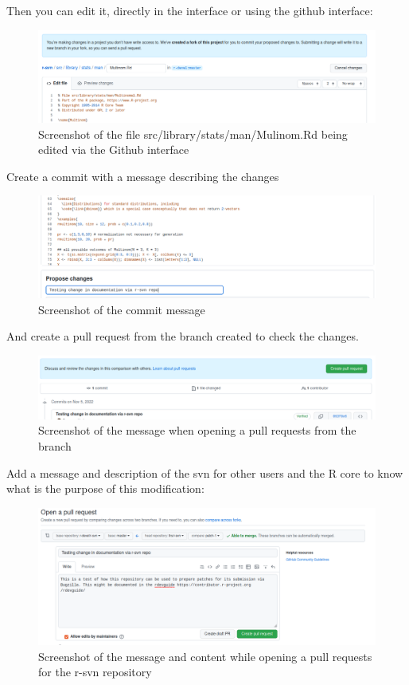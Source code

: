 \documentclass[
]{book}
\begin{document}
Then you can edit it, directly in the interface or using the github interface:

\begin{figure}
\centering
\includegraphics{img/rsvn_edit_file.png}
\caption{Screenshot of the file src/library/stats/man/Mulinom.Rd being edited via the Github interface}
\end{figure}

Create a commit with a message describing the changes

\begin{figure}
\centering
\includegraphics{img/rsvn_commit_message.png}
\caption{Screenshot of the commit message}
\end{figure}

And create a pull request from the branch created to check the changes.

\begin{figure}
\centering
\includegraphics{img/rsvn_commit_pre_PR.png}
\caption{Screenshot of the message when opening a pull requests from the branch}
\end{figure}

Add a message and description of the svn for other users and the R core to know what is the purpose of this modification:

\begin{figure}
\centering
\includegraphics{img/rsvn_PR_message.png}
\caption{Screenshot of the message and content while opening a pull requests for the r-svn repository}
\end{figure}
\end{document}

